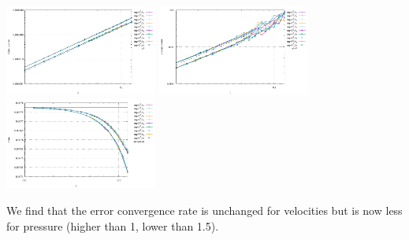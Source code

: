 \begin{center}
\includegraphics[width=5cm]{python_codes/fieldstone_72/results/mms/errors_v_rand}
\includegraphics[width=5cm]{python_codes/fieldstone_72/results/mms/errors_p_rand}
\includegraphics[width=5cm]{python_codes/fieldstone_72/results/mms/vrms_rand}
\end{center}

We find that the error convergence rate is unchanged for velocities but is now less 
for pressure (higher than 1, lower than 1.5). 

